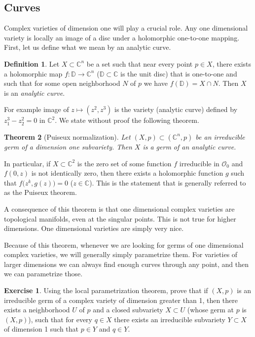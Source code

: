 \documentclass[12pt,openany]{book}
\newcommand{\C}{{\mathbb{C}}}
\newcommand{\bD}{{\mathbb{D}}}
\newcommand{\sO}{{\mathcal{O}}}
\newcommand{\myindex}[1]{#1\index{#1}}
\theoremstyle{plain}
\newtheorem{thm}{Theorem}[section]
\theoremstyle{remark}
\theoremstyle{definition}
\newtheorem{defn}[thm]{Definition}
\theoremstyle{exercise}
\newtheorem{exercise}{Exercise}[section]
\theoremstyle{example}
\begin{document}
\subsection{Curves}

Complex varieties of dimension one will play a crucial role.
Any one dimensional variety is locally an image of a disc under a
holomorphic one-to-one mapping.
First, let us define what we mean by
an analytic curve.

\begin{defn}
Let $X \subset \C^n$ be a set such that near every point $p \in X$, there
exists a holomorphic map $f \colon \bD \to \C^n$ ($\bD \subset \C$ is the
unit disc) that is one-to-one and such that for some open neighborhood
$N$ of $p$ we have $f(\bD) = X \cap N$.  Then $X$ is an
\emph{\myindex{analytic curve}}.
\end{defn}

For example image of $z \mapsto (z^2,z^3)$ is the variety (analytic curve)
defined by $z_1^3-z_2^2 = 0$ in $\C^2$.  We state without proof the
following theorem.

\begin{thm}[Puiseux normalization]
Let $(X,p) \subset (\C^n,p)$ be an irreducible germ of
a dimension one subvariety.  Then $X$ is a germ of an analytic curve.
\end{thm}

In particular, if $X \subset \C^2$ is the zero set of some function $f$
irreducible in $\sO_0$
and $f(0,z)$ is not identically zero, then there
exists a holomorphic function $g$ such that $f\bigl(z^k,g(z)\bigr) = 0$ ($z \in \C$).
This is the statement that is generally referred to as the Puiseux theorem.

A consequence of this theorem is that one dimensional complex varieties
are topological manifolds, even at the singular points.  This is not true for
higher dimensions.  One dimensional varieties are simply very nice.

Because of this theorem, whenever we are looking for germs of
one dimensional complex
varieties, we will generally simply parametrize them.  For 
varieties of larger
dimensions we can always find enough curves through any point,
and then we can parametrize those.

\begin{exercise}
\pagebreak[2]
Using the local parametrization theorem, prove that
if $(X,p)$ is an irreducible germ of a complex variety of dimension greater
than 1, then there exists a neighborhood $U$ of $p$ and a closed subvariety
$X \subset U$ (whose germ at $p$ is $(X,p)$), such that for every
$q \in X$ there exists an irreducible subvariety $Y \subset X$
of dimension 1 such that $p \in Y$ and $q \in Y$.
\end{exercise}
\end{document}
